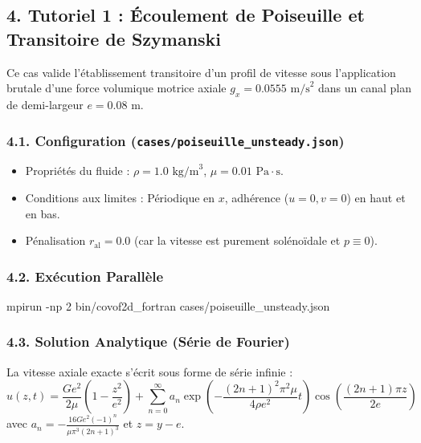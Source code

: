 \documentclass[
  french,
]{article}
\newenvironment{Shaded}{}{}
\newcommand{\AttributeTok}[1]{\textcolor[rgb]{0.49,0.56,0.16}{#1}}
\newcommand{\ExtensionTok}[1]{#1}
\newcommand{\NormalTok}[1]{#1}
\providecommand{\tightlist}{%
  \setlength{\itemsep}{0pt}\setlength{\parskip}{0pt}}
\begin{document}
\subsection{4. Tutoriel 1 : Écoulement de Poiseuille et Transitoire de
Szymanski}\label{tutoriel-1-uxe9coulement-de-poiseuille-et-transitoire-de-szymanski}

Ce cas valide l'établissement transitoire d'un profil de vitesse sous
l'application brutale d'une force volumique motrice axiale
\(g_x = 0.0555\text{ m/s}^2\) dans un canal plan de demi-largeur
\(e = 0.08\text{ m}\).

\subsubsection{\texorpdfstring{4.1. Configuration
(\texttt{cases/poiseuille\_unsteady.json})}{4.1. Configuration (cases/poiseuille\_unsteady.json)}}\label{configuration-casespoiseuille_unsteady.json}

\begin{itemize}
\tightlist
\item
  Propriétés du fluide : \(\rho = 1.0\text{ kg/m}^3\),
  \(\mu = 0.01\text{ Pa}\cdot\text{s}\).
\item
  Conditions aux limites : Périodique en \(x\), adhérence (\(u=0, v=0\))
  en haut et en bas.
\item
  Pénalisation \(r_{\text{al}} = 0.0\) (car la vitesse est purement
  solénoïdale et \(p \equiv 0\)).
\end{itemize}

\subsubsection{4.2. Exécution
Parallèle}\label{exuxe9cution-paralluxe8le}

\begin{Shaded}
\begin{Highlighting}[]
\ExtensionTok{mpirun} \AttributeTok{{-}np}\NormalTok{ 2 bin/covof2d\_fortran cases/poiseuille\_unsteady.json}
\end{Highlighting}
\end{Shaded}

\subsubsection{4.3. Solution Analytique (Série de
Fourier)}\label{solution-analytique-suxe9rie-de-fourier}

La vitesse axiale exacte s'écrit sous forme de série infinie :
\[u(z, t) = \frac{G e^2}{2\mu} \left( 1 - \frac{z^2}{e^2} \right) + \sum_{n=0}^{\infty} a_n \exp\left( - \frac{(2n+1)^2 \pi^2 \mu}{4 \rho e^2} t \right) \cos\left( \frac{(2n+1) \pi z}{2e} \right)\]
avec \(a_n = -\frac{16 G e^2 (-1)^n}{\mu \pi^3 (2n+1)^3}\) et
\(z = y - e\).
\end{document}
